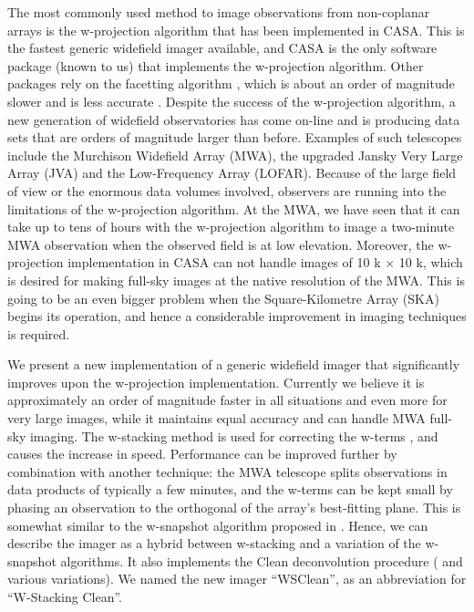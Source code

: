 \documentclass[a4paper,10pt]{article}
\begin{document}
The most commonly used method to image observations from non-coplanar arrays is the w-projection algorithm \citep{wprojection-cornwell} that has been implemented in CASA. This is the fastest generic widefield imager available, and CASA is the only software package (known to us) that implements the w-projection algorithm. Other packages rely on the facetting algorithm \citep{facetting-cornwell}, which is about an order of magnitude slower and is less accurate \citep{wprojection-cornwell}. Despite the success of the w-projection algorithm, a new generation of widefield observatories has come on-line and is producing data sets that are orders of magnitude larger than before. Examples of such telescopes include the Murchison Widefield Array (MWA), the upgraded Jansky Very Large Array (JVA) and the Low-Frequency Array (LOFAR). Because of the large field of view or the enormous data volumes involved, observers are running into the limitations of the w-projection algorithm. At the MWA, we have seen that it can take up to tens of hours with the w-projection algorithm to image a two-minute MWA observation when the observed field is at low elevation. Moreover, the w-projection implementation in CASA can not handle images of 10 k $\times$ 10 k, which is desired for making full-sky images at the native resolution of the MWA. This is going to be an even bigger problem when the Square-Kilometre Array (SKA) begins its operation, and hence a considerable improvement in imaging techniques is required.

We present a new implementation of a generic widefield imager that significantly improves upon the w-projection implementation. Currently we believe it is approximately an order of magnitude faster in all situations and even more for very large images, while it maintains equal accuracy and can handle MWA full-sky imaging. The w-stacking method is used for correcting the w-terms \citep{widefield-imaging-ska-cornwell}, and causes the increase in speed. Performance can be improved further by combination with another technique: the MWA telescope splits observations in data products of typically a few minutes, and the w-terms can be kept small by phasing an observation to the orthogonal of the array's best-fitting plane. This is somewhat similar to the w-snapshot algorithm proposed in \citet{widefield-imaging-ska-cornwell}. Hence, we can describe the imager as a hybrid between w-stacking and a variation of the w-snapshot algorithms. It also implements the Clean deconvolution procedure (\citealt{hogbom-clean} and various variations). We named the new imager ``WSClean'', as an abbreviation for ``W-Stacking Clean''.
\end{document}
